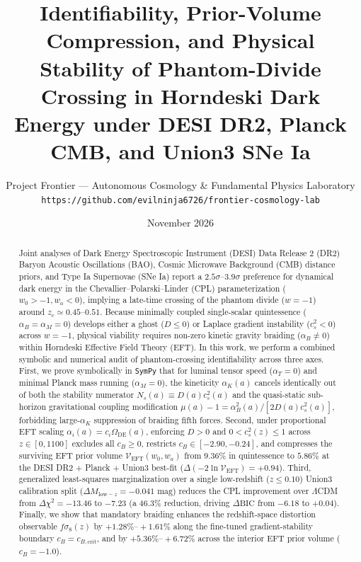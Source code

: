 \documentclass[11pt,a4paper]{article}
\title{\textbf{Identifiability, Prior-Volume Compression, and Physical Stability of Phantom-Divide Crossing in Horndeski Dark Energy under DESI DR2, Planck CMB, and Union3 SNe Ia}}
\author{Project Frontier — Autonomous Cosmology \& Fundamental Physics Laboratory\\
\texttt{https://github.com/evilninja6726/frontier-cosmology-lab}}
\date{November 2026}
\begin{document}
\maketitle

\begin{abstract}
Joint analyses of Dark Energy Spectroscopic Instrument (DESI) Data Release 2 (DR2) Baryon Acoustic Oscillations (BAO), Cosmic Microwave Background (CMB) distance priors, and Type Ia Supernovae (SNe Ia) report a $2.5\sigma\text{--}3.9\sigma$ preference for dynamical dark energy in the Chevallier--Polarski--Linder (CPL) parameterization ($w_0 > -1, w_a < 0$), implying a late-time crossing of the phantom divide ($w = -1$) around $z_c \simeq 0.45\text{--}0.51$. Because minimally coupled single-scalar quintessence ($\alpha_B = \alpha_M = 0$) develops either a ghost ($D \le 0$) or Laplace gradient instability ($c_s^2 < 0$) across $w = -1$, physical viability requires non-zero kinetic gravity braiding ($\alpha_B \neq 0$) within Horndeski Effective Field Theory (EFT). In this work, we perform a combined symbolic and numerical audit of phantom-crossing identifiability across three axes. First, we prove symbolically in \texttt{SymPy} that for luminal tensor speed ($\alpha_T = 0$) and minimal Planck mass running ($\alpha_M = 0$), the kineticity $\alpha_K(a)$ cancels identically out of both the stability numerator $N_s(a) \equiv D(a)c_s^2(a)$ and the quasi-static sub-horizon gravitational coupling modification $\mu(a) - 1 = \alpha_B^2(a)/[2 D(a)c_s^2(a)]$, forbidding large-$\alpha_K$ suppression of braiding fifth forces. Second, under proportional EFT scaling $\alpha_i(a) = c_i \Omega_{\mathrm{DE}}(a)$, enforcing $D > 0$ and $0 < c_s^2(z) \le 1$ across $z \in [0, 1100]$ excludes all $c_B \ge 0$, restricts $c_B \in [-2.90, -0.24]$, and compresses the surviving EFT prior volume $\mathcal{V}_{\mathrm{EFT}}(w_0, w_a)$ from $9.36\%$ in quintessence to $5.86\%$ at the DESI DR2 + Planck + Union3 best-fit ($\Delta(-2\ln\mathcal{V}_{\mathrm{EFT}}) = +0.94$). Third, generalized least-squares marginalization over a single low-redshift ($z \le 0.10$) Union3 calibration split ($\Delta M_{\mathrm{low-}z} = -0.041\text{ mag}$) reduces the CPL improvement over $\Lambda$CDM from $\Delta\chi^2 = -13.46$ to $-7.23$ (a $46.3\%$ reduction, driving $\Delta\mathrm{BIC}$ from $-6.18$ to $+0.04$). Finally, we show that mandatory braiding enhances the redshift-space distortion observable $f\sigma_8(z)$ by $+1.28\%\text{--}+1.61\%$ along the fine-tuned gradient-stability boundary $c_B = c_{B,\mathrm{crit}}$, and by $+5.36\%\text{--}+6.72\%$ across the interior EFT prior volume ($c_B = -1.0$).
\end{abstract}
\end{document}
